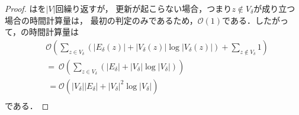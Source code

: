 \begin{proof}
  はを$\lvert V\rvert$回繰り返すが，
  更新が起こらない場合，つまり$z\notin V_\delta$が成り立つ場合の時間計算量は，
  最初の判定のみであるため，$\mathcal{O}(1)$である．したがって，の時間計算量は
  \begin{equation*}
    \begin{aligned}
      &\mathcal{O}(
      \sum_{z\in V_\delta}(\lvert E_\delta(z)\rvert+\lvert V_\delta(z)\rvert\log\lvert V_\delta(z)\rvert)
      +\sum_{z\notin V_\delta}1) \nonumber\\
      &=\:\mathcal{O}(\sum_{z\in V_\delta}(\lvert E_\delta\rvert
      +\lvert V_\delta\rvert\log\lvert V_\delta\rvert))\nonumber\\
      &\:=\mathcal{O}(\lvert V_\delta\rvert\lvert E_\delta\rvert
      +\lvert V_\delta\rvert^2\log\lvert V_\delta\rvert) \nonumber\\
    \end{aligned}
  \end{equation*}
  である．
\end{proof}
